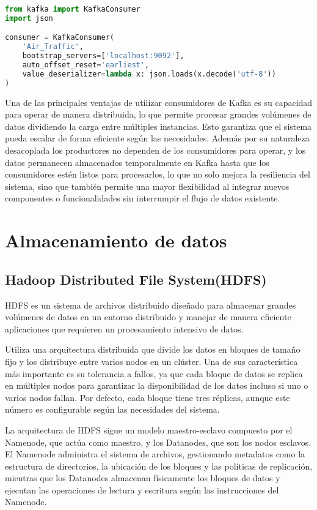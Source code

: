 \documentclass{article}
\begin{document}
\begin{lstlisting}[language=Python, caption={Configuración del KafkaConsumer}]
from kafka import KafkaConsumer
import json

consumer = KafkaConsumer(
    'Air_Traffic',
    bootstrap_servers=['localhost:9092'],
    auto_offset_reset='earliest',
    value_deserializer=lambda x: json.loads(x.decode('utf-8'))
)
\end{lstlisting}

Una de las principales ventajas de utilizar consumidores de Kafka es su capacidad para operar de manera distribuida, lo que permite procesar grandes volúmenes de datos dividiendo la carga entre múltiples instancias. Esto garantiza que el sistema pueda escalar de forma eficiente según las necesidades.
Además por su naturaleza desacoplada los productores no dependen de los consumidores para operar, y los datos permanecen almacenados temporalmente en Kafka hasta que los consumidores estén listos para procesarlos, lo que no solo mejora la resiliencia del sistema, sino que también permite una mayor flexibilidad al integrar nuevos componentes o funcionalidades sin interrumpir el flujo de datos existente.

\section{Almacenamiento de datos}

\subsection{Hadoop Distributed File System(HDFS)}

HDFS es un sistema de archivos distribuido diseñado para almacenar grandes volúmenes de datos en un entorno distribuido y manejar de manera eficiente aplicaciones que requieren un procesamiento intensivo de datos.

Utiliza una arquitectura distribuida que divide los datos en bloques de tamaño fijo y los distribuye entre varios nodos en un clúster. Una de sus característica más importante es su  tolerancia a fallos, ya que cada bloque de datos se replica en múltiples nodos para garantizar la disponibilidad de los datos incluso si uno o varios nodos fallan. Por defecto, cada bloque tiene tres réplicas, aunque este número es configurable según las necesidades del sistema.

La arquitectura de HDFS sigue un modelo maestro-esclavo compuesto por el Namenode, que actúa como maestro, y los Datanodes, que son los nodos esclavos. El Namenode administra el sistema de archivos, gestionando metadatos como la estructura de directorios, la ubicación de los bloques y las políticas de replicación, mientras que los Datanodes almacenan físicamente los bloques de datos y ejecutan las operaciones de lectura y escritura según las instrucciones del Namenode.
\end{document}
